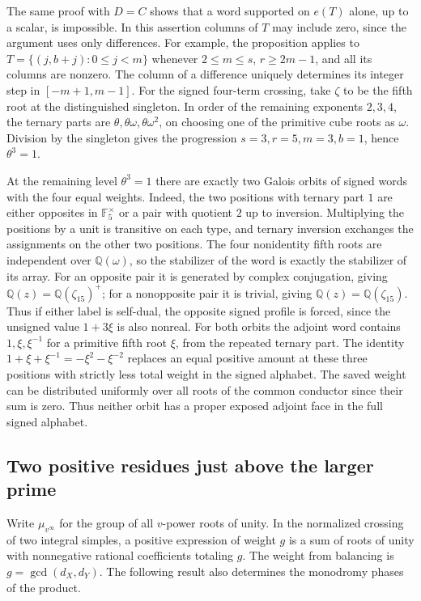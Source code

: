 \documentclass[11pt,a4paper]{article}
\numberwithin{equation}{section}
\theoremstyle{remark}
\begin{document}
The same proof with $D=C$ shows that a word supported on $e(T)$
alone, up to a scalar, is impossible. In this assertion columns of $T$
may include zero, since the argument uses only differences.
For example, the proposition applies to
$T=\{(j,b+j):0\le j<m\}$ whenever $2\le m\le s$,
$r\ge2m-1$, and all its columns are nonzero. The column of a difference
uniquely determines its integer step in $[-m+1,m-1]$.
For the signed four-term crossing, take $\zeta$ to be the fifth root
at the distinguished singleton. In order of the remaining exponents
$2,3,4$, the ternary parts are $\theta,\theta\omega,\theta\omega^2$,
on choosing one of the primitive cube roots as $\omega$. Division by
the singleton gives the progression $s=3,r=5,m=3,b=1$, hence
$\theta^3=1$.

At the remaining level $\theta^3=1$ there are exactly two Galois
orbits of signed words with the four equal weights. Indeed, the two
positions with ternary part $1$ are either opposites in
$\mathbb F_5^\times$ or a pair with quotient $2$ up to inversion.
Multiplying the positions by a unit is transitive on each type, and
ternary inversion exchanges the assignments on the other two positions.
The four nonidentity fifth roots are independent over $\mathbb Q(\omega)$,
so the stabilizer of the word is exactly the stabilizer of its array.
For an opposite pair it is generated by complex conjugation, giving
$\mathbb Q(z)=\mathbb Q(\zeta_{15})^+$; for a nonopposite pair it is
trivial, giving $\mathbb Q(z)=\mathbb Q(\zeta_{15})$. Thus if either
label is self-dual, the opposite signed profile is forced, since the
unsigned value $1+3\xi$ is also nonreal.
For both orbits the adjoint word contains $1,\xi,\xi^{-1}$ for a
primitive fifth root $\xi$, from the repeated ternary part. The identity
$1+\xi+\xi^{-1}=-\xi^2-\xi^{-2}$ replaces an equal positive amount at
these three positions with strictly less total weight in the signed
alphabet. The saved weight can be distributed uniformly over all
roots of the common conductor since their sum is zero. Thus neither
orbit has a proper exposed adjoint face in the full signed alphabet.

\subsection{Two positive residues just above the larger prime}\label{found:C:3}
Write $\mu_{v^\infty}$ for the group of all $v$-power roots of unity.
In the normalized crossing of two integral simples, a positive
expression of weight $g$ is a sum of roots of unity with nonnegative
rational coefficients totaling $g$. The weight from balancing is
$g=\gcd(d_X,d_Y)$. The following result also determines the
monodromy phases of the product.
\end{document}
